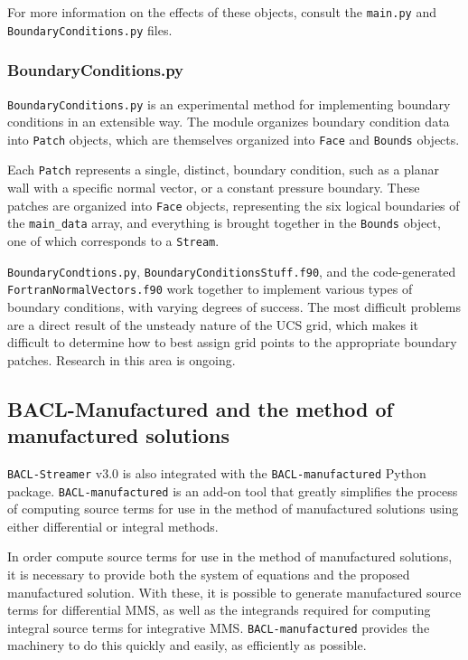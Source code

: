 For more information on the effects of these objects, consult the {\tt main.py} and {\tt BoundaryConditions.py} files.

\subsubsection{BoundaryConditions.py}
{\tt BoundaryConditions.py} is an experimental method for implementing boundary conditions in an extensible way. The module organizes boundary condition data into {\tt Patch} objects, which are themselves organized into {\tt Face} and {\tt Bounds} objects. 

Each {\tt Patch} represents a single, distinct, boundary condition, such as a planar wall with a specific normal vector, or a constant pressure boundary. These patches are organized into {\tt Face} objects, representing the six logical boundaries of the {\tt main\_data} array, and everything is brought together in the {\tt Bounds} object, one of which corresponds to a {\tt Stream}. 

{\tt BoundaryCondtions.py}, {\tt BoundaryConditionsStuff.f90}, and the code-generated {\tt FortranNormalVectors.f90} work together to implement various types of boundary conditions, with varying degrees of success. The most difficult problems are a direct result of the unsteady nature of the UCS grid, which makes it difficult to determine how to best assign grid points to the appropriate boundary patches. Research in this area is ongoing. 

\subsection{BACL-Manufactured and the method of manufactured solutions}
{\tt BACL-Streamer} v3.0 is also integrated with the {\tt BACL-manufactured} Python package. {\tt BACL-manufactured} is an add-on tool that greatly simplifies the process of computing source terms for use in the method of manufactured solutions using either differential or integral methods. 

In order compute source terms for use in the method of manufactured solutions, it is necessary to provide both the system of equations and the proposed manufactured solution. With these, it is possible to generate manufactured source terms for differential MMS, as well as the integrands required for computing integral source terms for integrative MMS. {\tt BACL-manufactured} provides the machinery to do this quickly and easily, as efficiently as possible.

